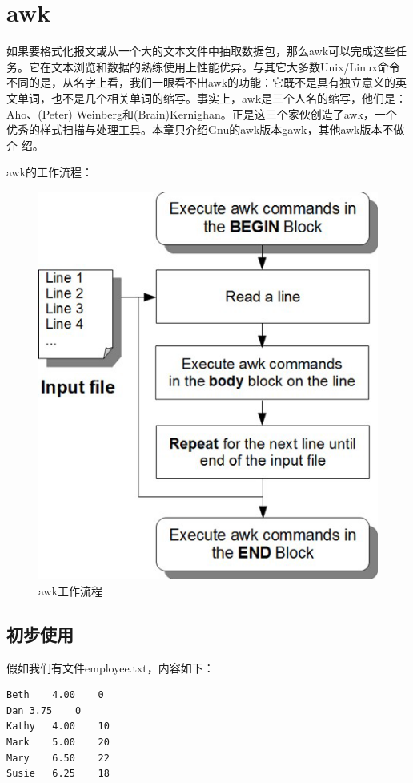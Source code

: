 \chapter{awk}
\label{sec:awk}

如果要格式化报文或从一个大的文本文件中抽取数据包，那么awk可以完成这些任
务。它在文本浏览和数据的熟练使用上性能优异。与其它大多数Unix/Linux命令
不同的是，从名字上看，我们一眼看不出awk的功能：它既不是具有独立意义的英
文单词，也不是几个相关单词的缩写。事实上，awk是三个人名的缩写，他们是：
Aho、(Peter) Weinberg和(Brain)Kernighan。正是这三个家伙创造了awk，一个
优秀的样式扫描与处理工具。本章只介绍Gnu的awk版本gawk，其他awk版本不做介
绍。

awk的工作流程：
\begin{figure}[!h]
  \centering
  \includegraphics[width=.75\textwidth]{graph/awk_workflow.png}
  \caption{awk工作流程}
  \label{fig:awk_workflow}
\end{figure}

\section{初步使用}
\label{sec:FirstAwk}

假如我们有文件employee.txt，内容如下：

\small{
\begin{verbatim}
Beth	4.00	0
Dan	3.75	0
Kathy	4.00	10
Mark	5.00	20
Mary	6.50	22
Susie	6.25	18
\end{verbatim}
}
\normalsize


